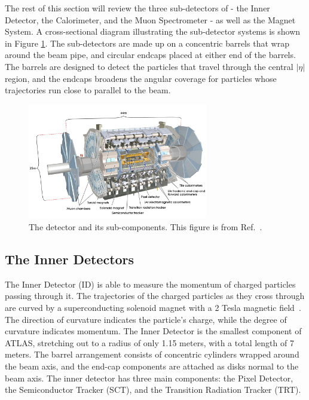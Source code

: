The rest of this section will review the three sub-detectors of \ATLAS - the Inner Detector, the Calorimeter, and the Muon Spectrometer - as well as the Magnet System. A cross-sectional diagram illustrating the sub-detector systems is shown in Figure \ref{fig:atlasdetector}. The sub-detectors are made up on a concentric barrels that wrap around the beam pipe, and circular endcaps placed at either end of the barrels. The barrels are designed to detect the particles that travel through the central $|\eta|$ region, and the endcaps broadens the angular coverage for particles whose trajectories run close to parallel to the beam. 



\begin{figure}[htb!]
    \centering
    \includegraphics[width=0.7\textwidth]{Figures/LHC/ATLASDetector.jpg}
    \caption{The \ATLAS detector and its sub-components. This figure is from Ref.~\cite{Reed:2014}.}
    \label{fig:atlasdetector}
\end{figure}

\subsection{The Inner Detectors} \label{ssec:ATLASID}
The Inner Detector (ID) is able to measure the momentum of charged particles passing through it. The trajectories of the charged particles as they cross through are curved by a superconducting solenoid magnet with a 2 Tesla magnetic field~\cite{Yamamoto:1999}. The direction of curvature indicates the particle's charge, while the degree of curvature indicates momentum. The Inner Detector is the smallest component of ATLAS, stretching out to a radius of only 1.15 meters, with a total length of 7 meters. The barrel arrangement consists of concentric cylinders wrapped around the beam axis, and the end-cap components are attached as disks normal to the beam axis. The inner detector has three main components: the Pixel Detector, the Semiconductor Tracker (SCT), and the Transition Radiation Tracker (TRT).

